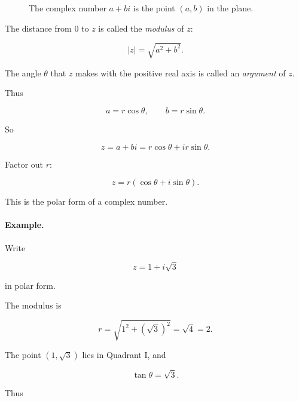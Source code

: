 \begin{figure}[h]
\centering
{}
\caption{The complex number \(a+bi\) is the point \((a,b)\) in the plane.}
\label{fig:complex-number-as-point}
\end{figure}

The distance from \(0\) to \(z\) is called the \emph{modulus} of \(z\):

\[
\boxed{
|z|=\sqrt{a^2+b^2}.
}
\]

The angle \(\theta\) that \(z\) makes with the positive real axis is called an
\emph{argument} of \(z\).

Thus

\[
a=r\cos\theta,
\qquad
b=r\sin\theta.
\]

So

\[
z=a+bi
=
r\cos\theta+i r\sin\theta.
\]

Factor out \(r\):

\[
\boxed{
z=r(\cos\theta+i\sin\theta).
}
\]

This is the polar form of a complex number.

\paragraph{Example.}
Write

\[
z=1+i\sqrt3
\]

in polar form.

The modulus is

\[
r=\sqrt{1^2+(\sqrt3)^2}=\sqrt4=2.
\]

The point \((1,\sqrt3)\) lies in Quadrant I, and

\[
\tan\theta=\sqrt3.
\]

Thus

